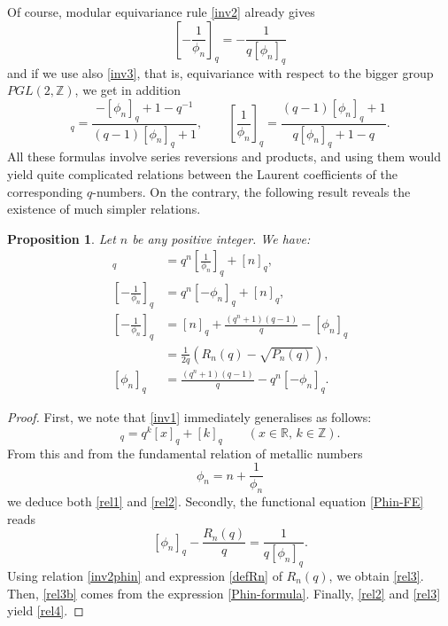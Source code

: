 \documentclass[11pt,reqno]{amsart}
\theoremstyle{plain}
\newtheorem{proposition}[lemme]{Proposition}
\theoremstyle{definition}
\numberwithin{figure}{section}
\numberwithin{table}{section}
\numberwithin{equation}{section}
\newcommand{\R}{\mathbb{R}}
\newcommand{\Z}{\mathbb{Z}}
\let\fr=\frac
\begin{document}
Of course, modular equivariance rule \eqref{inv2}  already gives 
\begin{equation}\label{inv2phin}
 \left[-\fr 1{\phi_n}\right]_q=-\fr 1{q[\phi_n]_q}
\end{equation}
and if we  use also \eqref{inv3}, that is, equivariance   with respect to the bigger group $PGL(2,\Z)$, we  get in addition
\begin{equation*}
[-\phi_n]_q=\fr{-[\phi_n]_q+1-q^{-1}}{(q-1)[\phi_n]_q+1},\qquad 
\left[\fr 1{\phi_n}\right]_q=\fr{(q-1)[\phi_n]_q+1}{q[\phi_n]_q+1-q}.
\end{equation*}
All these formulas involve series reversions and products, and using them would yield quite complicated relations between the Laurent coefficients of the corresponding $q$-numbers. On the contrary, the following result reveals the existence of much simpler relations.

\begin{proposition}
Let $n$ be any positive integer.
We have:
\begin{align}
[\phi_n]_q&=q^n\left[\fr 1{\phi_n}\right]_q+[n]_q, \label{rel1}\\
\left[-\fr 1{\phi_n}\right]_q&=q^n[-\phi_n]_q+[n]_q,\label{rel2}\\
\left[-\fr 1{\phi_n}\right]_q&=[n]_q+\fr{(q^n+1)(q-1)}q -[\phi_n]_q \label{rel3}\\
&=\frac{1}{2q}\left(R_n(q)-\sqrt{P_n(q)}\right),\label{rel3b}\\
[\phi_n]_q&=\fr{(q^n+1)(q-1)}q -q^n [-\phi_n]_q.\label{rel4}
\end{align}
\end{proposition}


\begin{proof}
First, we note that \eqref{inv1} immediately generalises as follows:
\begin{equation*}
[x+k]_q=q^k[x]_q+[k]_q\qquad (x\in\R,\, k\in\Z).
\end{equation*}
From this and from the fundamental relation of metallic numbers
\begin{equation*}
\phi_n=n+\fr 1{\phi_n}
\end{equation*}
we  deduce both \eqref{rel1} and \eqref{rel2}. Secondly, the functional equation \eqref{Phin-FE} reads
\begin{equation}\label{Phin-FE2}
[\phi_n]_q-\fr{R_n(q)}{q}=\fr 1{q[\phi_n]_q}.
\end{equation} 
Using relation \eqref{inv2phin} and  expression \eqref{defRn} of $R_n(q)$, we obtain \eqref{rel3}. Then, \eqref{rel3b} comes from the expression \eqref{Phin-formula}. Finally,  \eqref{rel2} and \eqref{rel3} yield \eqref{rel4}.
\end{proof}
\end{document}
